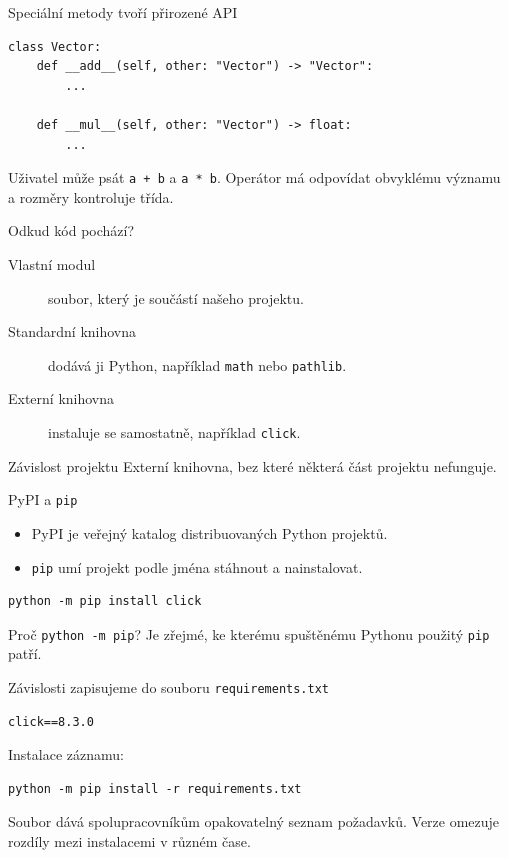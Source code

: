 \documentclass[aspectratio=169]{beamer}
\begin{document}
\begin{frame}[fragile]{Speciální metody tvoří přirozené API}
\begin{lstlisting}[style=pythonSmall]
class Vector:
    def __add__(self, other: "Vector") -> "Vector":
        ...

    def __mul__(self, other: "Vector") -> float:
        ...
\end{lstlisting}
  Uživatel může psát \texttt{a + b} a \texttt{a * b}. Operátor má odpovídat obvyklému významu a rozměry kontroluje třída.
\end{frame}

\begin{frame}{Odkud kód pochází?}
  \begin{description}
    \item[Vlastní modul] soubor, který je součástí našeho projektu.
    \item[Standardní knihovna] dodává ji Python, například \texttt{math} nebo \texttt{pathlib}.
    \item[Externí knihovna] instaluje se samostatně, například \texttt{click}.
  \end{description}
  \begin{block}{Závislost projektu}
    Externí knihovna, bez které některá část projektu nefunguje.
  \end{block}
\end{frame}

\begin{frame}[fragile]{PyPI a \texttt{pip}}
  \begin{itemize}
    \item PyPI je veřejný katalog distribuovaných Python projektů.
    \item \texttt{pip} umí projekt podle jména stáhnout a nainstalovat.
  \end{itemize}
\begin{lstlisting}[basicstyle=\ttfamily\large,columns=fullflexible]
python -m pip install click
\end{lstlisting}
  \begin{block}{Proč \texttt{python -m pip}?}
    Je zřejmé, ke kterému spuštěnému Pythonu použitý \texttt{pip} patří.
  \end{block}
\end{frame}

\begin{frame}[fragile]{Závislosti zapisujeme do souboru}
  \texttt{requirements.txt}
\begin{lstlisting}[basicstyle=\ttfamily\large,columns=fullflexible]
click==8.3.0
\end{lstlisting}
  Instalace záznamu:
\begin{lstlisting}[basicstyle=\ttfamily\large,columns=fullflexible]
python -m pip install -r requirements.txt
\end{lstlisting}
  Soubor dává spolupracovníkům opakovatelný seznam požadavků. Verze omezuje rozdíly mezi instalacemi v různém čase.
\end{frame}
\end{document}
